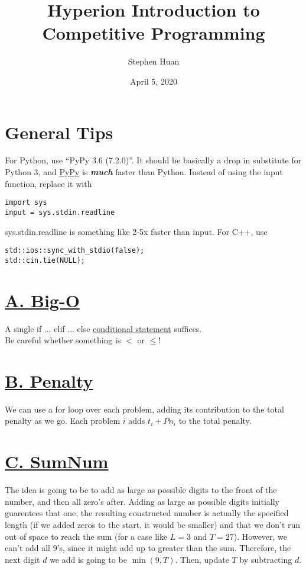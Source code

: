 \documentclass[11pt, oneside]{article}
\title{Hyperion Introduction to Competitive Programming}
\author{Stephen Huan}
\date{April 5, 2020}
\newcommand{\emphasis}[1]{\textbf{\textit{#1}}}
\begin{document}
\maketitle

\section{General Tips}

For Python, use ``PyPy 3.6 (7.2.0)''. It should be basically a drop in substitute for Python 3,
and \href{https://www.pypy.org/}{PyPy} is \emphasis{much} faster than Python.
Instead of using the input function, replace it with

\begin{verbatim}
import sys
input = sys.stdin.readline
\end{verbatim}

\noindent
sys.stdin.readline is something like 2-5x faster than input.
For C++, use
\begin{verbatim}
std::ios::sync_with_stdio(false);
std::cin.tie(NULL);
\end{verbatim}

\section{\href{https://codeforces.com/group/XaPbwwWypc/contest/275182/problem/A}{A. Big-O}}
A single if ... elif ... else \href{https://realpython.com/python-conditional-statements/}{conditional statement} suffices.
\\ Be careful whether something is \( < \) or \( \leq \)!

\section{\href{https://codeforces.com/group/XaPbwwWypc/contest/275182/problem/B}{B. Penalty}}
We can use a for loop over each problem, adding its contribution to the total penalty as we go.
Each problem \( i \) adds \( t_i + P n_i \) to the total penalty.

\section{\href{https://codeforces.com/group/XaPbwwWypc/contest/275182/problem/C}{C. SumNum}}
The idea is going to be to add as large as possible digits to the front of the number,
and then all zero's after. Adding as large as possible digits initially guarentees
that one, the resulting constructed number is actually the specified length
(if we added zeros to the start, it would be smaller) and that we don't run
out of space to reach the sum (for a case like \( L = 3 \) and \( T = 27 \)).
However, we can't add all 9's, since it might add up to greater than the sum.
Therefore, the next digit \( d \) we add is going to be \( \min(9, T) \).
Then, update \( T \) by subtracting \( d \).
\end{document}

